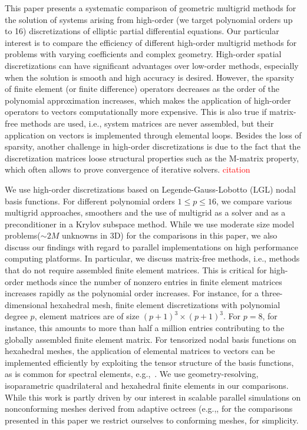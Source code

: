 \documentclass[smallcondensed,final]{svjour3}     %
\newcommand{\todo}[1]{\textcolor{red}{ #1}}
\begin{document}
This paper presents a systematic comparison of geometric multigrid methods for
the solution of systems arising from high-order (we target polynomial orders up
to 16) discretizations of elliptic partial differential equations. Our
particular interest is to compare the efficiency of different high-order
multigrid methods for problems with varying coefficients and complex geometry.
High-order spatial discretizations can have significant advantages over
low-order methods, especially when the solution is smooth and high accuracy is
desired. However, the sparsity of finite element (or finite difference)
operators decreases as the order of the polynomial approximation increases,
which makes the application of high-order operators to vectors computationally
more expensive. This is also true if matrix-free methods are used, i.e., system
matrices are never assembled, but their application on vectors is implemented
through elemental loops.  Besides the loss of sparsity, another challenge in
high-order discretizations is due to the fact that the discretization matrices
loose structural properties such as the M-matrix property, which often allows
to prove convergence of iterative solvers. \todo{citation}

We use high-order discretizations based on Legende-Gauss-Lobotto (LGL) nodal
basis functions. For different polynomial orders $1\le p\le 16$, we compare
various multigrid approaches, smoothers and the use of multigrid as a solver
and as a preconditioner in a Krylov subspace method.  While we use moderate
size model problems($\sim 2M$ unknowns in 3D) for the comparisons in this
paper, we also discuss our findings with regard to parallel implementations on
high performance computing platforms.  In particular, we discuss matrix-free
methods, i.e., methods that do not require assembled finite element matrices.
This is critical for high-order methods since the number of nonzero entries in
finite element matrices increases rapidly as the polynomial order increases.
For instance, for a three-dimensional hexahedral mesh, finite element
discretizations with polynomial degree $p$, element matrices are of size
$(p+1)^3\times (p+1)^3$. For $p=8$, for instance, this amounts to more than
half a million entries contributing to the globally assembled finite element
matrix.  For tensorized nodal basis functions on hexahedral meshes, the
application of elemental matrices to vectors can be implemented efficiently by
exploiting the tensor structure of the basis functions, as is common for
spectral elements, e.g.,~\cite{DevilleFischerMund02}. We use
geometry-resolving, isoparametric quadrilateral and hexahedral finite elements
in our comparisons. While this work is partly driven by our interest in
scalable parallel simulations on nonconforming meshes derived from adaptive
octrees (e.g.,\cite{SundarBirosBursteddeEtAl12, SampathBiros10,
BursteddeGhattasGurnisEtAl10}, for the comparisons presented in this paper we
restrict ourselves to conforming meshes, for simplicity.
\end{document}

